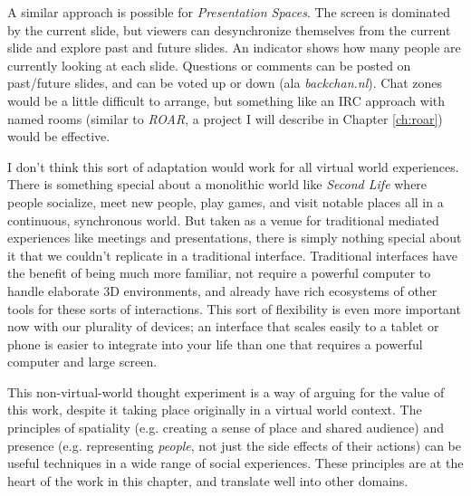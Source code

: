 A similar approach is possible for \emph{Presentation Spaces}. The screen is dominated by the current slide, but viewers can desynchronize themselves from the current slide and explore past and future slides. An indicator shows how many people are currently looking at each slide. Questions or comments can be posted on past/future slides, and can be voted up or down (ala \emph{backchan.nl}). Chat zones would be a little difficult to arrange, but something like an IRC approach with named rooms (similar to \emph{ROAR}, a project I will describe in Chapter \ref{ch:roar}) would be effective. 

I don't think this sort of adaptation would work for all virtual world experiences. There is something special about a monolithic world like \emph{Second Life} where people socialize, meet new people, play games, and visit notable places all in a continuous, synchronous world. But taken as a venue for traditional mediated experiences like meetings and presentations, there is simply nothing special about it that we couldn't replicate in a traditional interface. Traditional interfaces have the benefit of being much more familiar, not require a powerful computer to handle elaborate 3D environments, and already have rich ecosystems of other tools for these sorts of interactions. This sort of flexibility is even more important now with our plurality of devices; an interface that scales easily to a tablet or phone is easier to integrate into your life than one that requires a powerful computer and large screen. 

This non-virtual-world thought experiment is a way of arguing for the value of this work, despite it taking place originally in a virtual world context. The principles of spatiality (e.g. creating a sense of place and shared audience) and presence (e.g. representing \emph{people}, not just the side effects of their actions) can be useful techniques in a wide range of social experiences. These principles are at the heart of the work in this chapter, and translate well into other domains.





